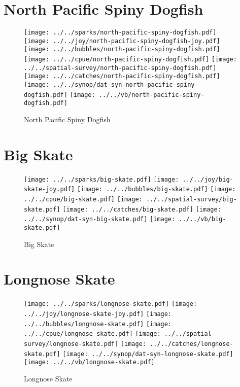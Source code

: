 \section{North Pacific Spiny Dogfish}

\begin{figure}[htbp]
\centering
\texttt{[image: ../../sparks/north-pacific-spiny-dogfish.pdf]}
\texttt{[image: ../../joy/north-pacific-spiny-dogfish-joy.pdf]}
\texttt{[image: ../../bubbles/north-pacific-spiny-dogfish.pdf]}
\texttt{[image: ../../cpue/north-pacific-spiny-dogfish.pdf]}
\texttt{[image: ../../spatial-survey/north-pacific-spiny-dogfish.pdf]}
\texttt{[image: ../../catches/north-pacific-spiny-dogfish.pdf]}
\texttt{[image: ../../synop/dat-syn-north-pacific-spiny-dogfish.pdf]}
\texttt{[image: ../../vb/north-pacific-spiny-dogfish.pdf]}
\caption{North Pacific Spiny Dogfish}
\end{figure}
\clearpage
\section{Big Skate}

\begin{figure}[htbp]
\centering
\texttt{[image: ../../sparks/big-skate.pdf]}
\texttt{[image: ../../joy/big-skate-joy.pdf]}
\texttt{[image: ../../bubbles/big-skate.pdf]}
\texttt{[image: ../../cpue/big-skate.pdf]}
\texttt{[image: ../../spatial-survey/big-skate.pdf]}
\texttt{[image: ../../catches/big-skate.pdf]}
\texttt{[image: ../../synop/dat-syn-big-skate.pdf]}
\texttt{[image: ../../vb/big-skate.pdf]}
\caption{Big Skate}
\end{figure}
\clearpage
\section{Longnose Skate}

\begin{figure}[htbp]
\centering
\texttt{[image: ../../sparks/longnose-skate.pdf]}
\texttt{[image: ../../joy/longnose-skate-joy.pdf]}
\texttt{[image: ../../bubbles/longnose-skate.pdf]}
\texttt{[image: ../../cpue/longnose-skate.pdf]}
\texttt{[image: ../../spatial-survey/longnose-skate.pdf]}
\texttt{[image: ../../catches/longnose-skate.pdf]}
\texttt{[image: ../../synop/dat-syn-longnose-skate.pdf]}
\texttt{[image: ../../vb/longnose-skate.pdf]}
\caption{Longnose Skate}
\end{figure}
\clearpage
